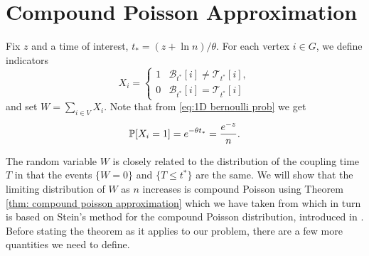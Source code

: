 
	\section{Compound Poisson Approximation}
	Fix $z$ and a time of interest, $t_* = (z + \ln n)/\theta$. For each vertex $i \in G$, we define indicators
	\begin{equation}
		X_i = 
		\begin{cases}
			1 & \mathscr{B}_{t^*}[i] \neq \mathscr{T}_{t^*}[i],\\
			0 & \mathscr{B}_{t^*}[i] = \mathscr{T}_{t^*}[i]
		\end{cases}
	\end{equation}
	and set $W = \sum_{i \in V} X_i$. Note that from \eqref{eq:1D bernoulli prob} we get
	\begin{equation}
		\label{eq:1D prob X_i}
		\mathbb{P}[X_i = 1] = e^{-\theta t_*} = \frac{e^{-z}}{n}.
	\end{equation}

	The random variable $W$ is closely related to the distribution of the coupling time $T$ in that the events $\{W = 0\}$ and $\{T \leq t^*\}$ are the same. We will show that the limiting distribution of $W$ as $n$ increases is compound Poisson using Theorem \ref{thm: compound poisson approximation} which we have taken from \cite{Barbour2001-nh} which in turn is based on Stein's method for the compound Poisson distribution, introduced in \cite{Barbour1992-mc}. Before stating the theorem as it applies to our problem, there are a few more quantities we need to define.

